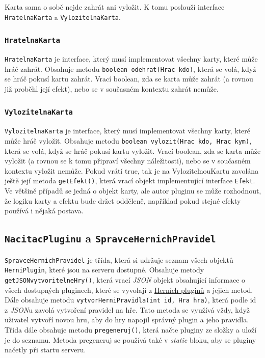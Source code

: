 Karta sama o sobě nejde zahrát ani vyložit. K tomu poslouží interface \texttt{HratelnaKarta} a \texttt{VylozitelnaKarta}.



\subsubsection{\texttt{HratelnaKarta}}
\texttt{HratelnaKarta} je interface, který musí implementovat všechny karty, které může hráč zahrát. Obsahuje metodu \texttt{boolean odehrat(Hrac kdo)}, která se volá, když se hráč pokusí kartu zahrát. Vrací boolean, zda se karta může zahrát (a rovnou již proběhl její efekt), nebo se v současném kontextu zahrát nemůže.

\subsubsection{\texttt{VylozitelnaKarta}}
\texttt{VylozitelnaKarta} je interface, který musí implementovat všechny karty, které může hráč vyložit. Obsahuje metodu \texttt{boolean vylozit(Hrac kdo, Hrac kym)}, která se volá, když se hráč pokusí kartu vyložit. Vrací boolean, zda se karta může vyložit (a rovnou se k tomu připraví všechny náležitosti), nebo se v současném kontextu vyložit nemůže. Pokud vrátí true, tak je na VylozitelnouKartu zavolána ještě její metoda \texttt{getEfekt()}, která vrací objekt implementující interface \texttt{Efekt}. Ve většině případů se jedná o objekt karty, ale autor pluginu se může rozhodnout, že logiku karty a efektu bude držet odděleně, například pokud stejné efekty používá i nějaká postava.

\hypertarget{nacitac-spravce}{}\subsection{\texttt{NacitacPluginu} a \texttt{SpravceHernichPravidel}}
\texttt{SpravceHernichPravidel} je třída, která si udržuje seznam všech objektů \texttt{HerniPlugin}, které jsou na serveru dostupné. Obsahuje metody \texttt{getJSONvytvoritelneHry()}, která vrací \emph{JSON} objekt obsahující informace o všech dostupných pluginech, které se vyvolají z \hyperlink{HerniPlugin}{Herních pluginů} a jejich metod. Dále obsahuje metodu \texttt{vytvorHerniPravidla(int id, Hra hra)}, která podle id z \emph{JSON}u zavolá vytvoření pravidel na hře. Tato metoda se využívá vždy, když uživatel vytvoří novou hru, aby do hry napojil správný plugin a jeho pravidla. Třída dále obsahuje metodu \texttt{pregeneruj()}, která načte pluginy ze složky  a uloží je do seznamu. Metoda pregeneruj se používá také v \emph{static} bloku, aby se pluginy načetly při startu serveru.

